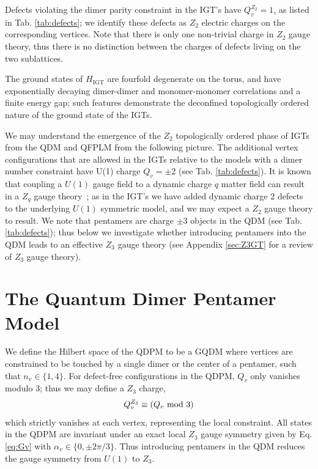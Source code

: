\documentclass[twocolumn,prb,aps,floatfix,superscriptaddress]{revtex4-1}
\newcommand{\tabref}[1]{Tab. \ref{#1}}
\newcommand{\appref}[1]{Appendix \ref{#1}}
\newcommand{\Eqref}[1]{Eq. \eqref{#1}}
\newcommand{\HIGT}{H_\mathrm{IGT}}
\begin{document}
Defects violating the dimer parity constraint in the IGT's have $Q_v^{Z_2} = 1$, as listed in \tabref{tab:defects}; we identify these defects as $Z_2$ electric charges on the corresponding vertices. Note that there is only one non-trivial charge in $Z_2$ gauge theory, thus there is no distinction between the charges of defects living on the two sublattices.

The ground states of $\HIGT$ are fourfold degenerate on the torus, and have exponentially decaying dimer-dimer and monomer-monomer correlations and a finite energy gap; such features demonstrate the deconfined topologically ordered nature of the ground state of the IGTs.

We may understand the emergence of the $Z_2$ topologically ordered phase of IGTs from the QDM and QFPLM from the following picture. The additional vertex configurations that are allowed in the IGTs relative to the models with a dimer number constraint  have U(1) charge $Q_v = \pm 2$ (see \tabref{tab:defects}). It is known that coupling a $U(1)$ gauge field to a dynamic charge $q$ matter field can result in a $Z_q$ gauge theory~\cite{Fradkin1979}; as in the IGT's we have added dynamic charge 2 defects to the underlying $U(1)$ symmetric model, and we may expect a $Z_2$ gauge theory to result. We note that pentamers are charge $\pm3$ objects in the QDM (see \tabref{tab:defects}); thus below we investigate whether introducing pentamers into the QDM leads to an effective $Z_3$ gauge theory (see \appref{sec:Z3GT} for a review of $Z_3$ gauge theory).


\section{The Quantum Dimer Pentamer Model}
\label{sec:QDPM}

We define the Hilbert space of the QDPM to be a GQDM where vertices are constrained to be touched by a single dimer or the center of a pentamer, such that $n_v \in \{1,4\}$. For defect-free configurations in the QDPM, $Q_v$ only vanishes modulo $3$;  thus we may define a $Z_3$ charge,
\begin{equation}
Q_v^{Z_3} \equiv \left(Q_v~\rm{mod}~3\right)
\end{equation}
 which strictly vanishes at each vertex, representing the local constraint. All states in the QDPM are invariant under an exact local $Z_3$ gauge symmetry given by \Eqref{eq:Gv} with $\alpha_v \in \{0,\pm 2\pi/3\}$. Thus introducing pentamers in the QDM reduces the gauge symmetry from $U(1)$ to $Z_3$.
\end{document}
